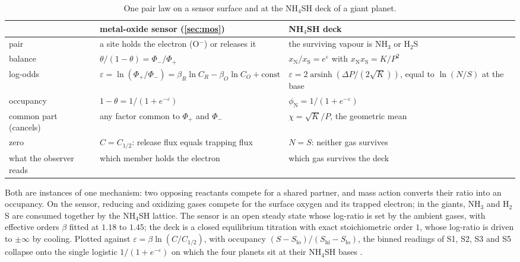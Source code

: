 \documentclass[11pt]{article}
\theoremstyle{definition}\newtheorem{definition}[theorem]{Definition}
\theoremstyle{remark}\newtheorem{remark}[theorem]{Remark}
\begin{document}
\begin{table}[htbp]\centering
\caption{One pair law on a sensor surface and at the NH$_4$SH deck of a giant planet.}\label{tab:shared}
\small
\begin{tabular}{@{}>{\raggedright\arraybackslash}p{}>{\raggedright\arraybackslash}p{}>{\raggedright\arraybackslash}p{}@{}}\toprule
 & metal-oxide sensor (\cref{sec:mos}) & NH$_4$SH deck \cite{Planet}\\\midrule
pair & a site holds the electron (O$^-$) or releases it & the surviving vapour is NH$_3$ or H$_2$S\\
balance & $\theta/(1-\theta)=\Phi_-/\Phi_+$ & $x_{\mathrm N}/x_{\mathrm S}=e^{\varepsilon}$ with $x_{\mathrm N}x_{\mathrm S}=K/P^2$\\
log-odds & $\varepsilon=\ln(\Phi_+/\Phi_-)=\beta_R\ln C_R-\beta_O\ln C_O+\mathrm{const}$ & $\varepsilon=2\operatorname{arsinh}(\Delta P/(2\sqrt K))$, equal to $\ln(N/S)$ at the base\\
occupancy & $1-\theta=1/(1+e^{-\varepsilon})$ & $\phi_{\mathrm N}=1/(1+e^{-\varepsilon})$\\
common part (cancels) & any factor common to $\Phi_+$ and $\Phi_-$ & $\chi=\sqrt K/P$, the geometric mean\\
zero & $C=C_{1/2}$: release flux equals trapping flux & $N=S$: neither gas survives\\
what the observer reads & which member holds the electron & which gas survives the deck\\\bottomrule
\end{tabular}
\end{table}

Both are instances of one mechanism: two opposing reactants compete for a shared partner, and mass action converts their ratio into an occupancy. On the sensor, reducing and oxidizing gases compete for the surface oxygen and its trapped electron; in the giants, NH$_3$ and H$_2$S are consumed together by the NH$_4$SH lattice. The sensor is an open steady state whose log-ratio is set by the ambient gases, with effective orders $\beta$ fitted at $1.18$ to $1.45$; the deck is a closed equilibrium titration with exact stoichiometric order $1$, whose log-ratio is driven to $\pm\infty$ by cooling. Plotted against $\varepsilon=\beta\ln(C/C_{1/2})$, with occupancy $(S-S_\mathrm{lo})/(S_\mathrm{hi}-S_\mathrm{lo})$, the binned readings of S1, S2, S3 and S5 collapse onto the single logistic $1/(1+e^{-\varepsilon})$ on which the four planets sit at their NH$_4$SH bases \cite{Planet}.
\end{document}
